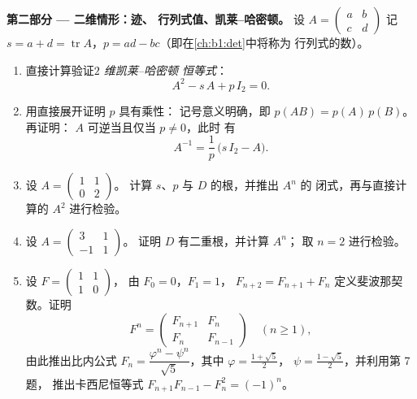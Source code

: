 \begin{problem}
\medskip
\noindent\textbf{第二部分 --- 二维情形：迹、
行列式值、凯莱–哈密顿。} 设 $A = \begin{pmatrix} a & b\\ c &
d\end{pmatrix}$ 记 $s = a + d = \operatorname{tr} A$，$p = ad
- bc$（即在\cref{ch:b1:det}中将称为
行列式的数）。
\begin{enumerate}[resume]
  \item 直接计算验证\emph{$2$ 维凯莱–哈密顿
        恒等式}：
        \[
        A^2 - s\,A + p\,I_2 = 0 .
        \]
  \item 用直接展开证明 $p$ 具有乘性：
        记号意义明确，即 $p(AB) = p(A)\,p(B)$。再证明：
        $A$ 可逆当且仅当 $p \neq 0$，此时
        有
        \[
        A^{-1} = \frac1p\,\bigl(s\,I_2 - A\bigr).
        \]
  \item 设 $A = \begin{pmatrix} 1 & 1\\ 0 & 2\end{pmatrix}$。
        计算 $s$、$p$ 与 $D$ 的根，并推出 $A^n$ 的
        闭式，再与直接计算的
        $A^2$ 进行检验。
  \item 设 $A = \begin{pmatrix} 3 & 1\\ -1 & 1\end{pmatrix}$。
        证明 $D$ 有二重根，并计算 $A^n$；
        取 $n = 2$ 进行检验。
  \item 设 $F = \begin{pmatrix} 1 & 1\\ 1 & 0\end{pmatrix}$，
        由 $F_0 = 0$，$F_1 = 1$，
        $F_{n+2} = F_{n+1} + F_n$ 定义斐波那契数。证明
        \[
        F^n = \begin{pmatrix} F_{n+1} & F_n\\ F_n &
        F_{n-1}\end{pmatrix} \quad (n \geq 1),
        \]
        由此推出比内公式 $F_n = \dfrac{\varphi^n -
        \psi^n}{\sqrt5}$，其中 $\varphi = \frac{1 + \sqrt5}2$，
        $\psi = \frac{1 - \sqrt5}2$，并利用第 7 题，
        推出卡西尼恒等式 $F_{n+1}F_{n-1} - F_n^2 = (-1)^n$。
\end{enumerate}


\end{problem}
